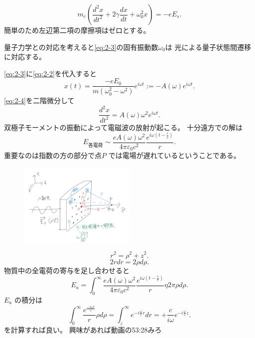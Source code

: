 \documentclass[dvipdfmx,12pt]{jsarticle}
\begin{document}
\begin{equation}
\label{eq:2-3}
m_e \left( \frac{d^2x}{dt^2}+2\gamma \frac{dx}{dt}+\omega_0^2x \right) =-eE_s
.\end{equation}
簡単のため左辺第二項の摩擦項はゼロとする。

量子力学との対応を考えると\eqref{eq:2-3}の固有振動数$\omega_0$は
光による量子状態間遷移に対応する。

\eqref{eq:2-3}に\eqref{eq:2-2}を代入すると
\begin{equation}
\label{eq:2-4}
	x(t)=\frac{-eE_0}{m(\omega_0^2-\omega^2)}e^{i\omega t}:=-A(\omega)e^{i\omega t}
.\end{equation}
\eqref{eq:2-4}を二階微分して
\begin{equation}
\label{eq:2-5}
	\frac{d^2x}{dt^2}=A(\omega)\omega^2e^{i\omega t}
.\end{equation}
双極子モーメントの振動によって電磁波の放射が起こる。
十分遠方での解は
\begin{equation}
\label{eq:2-6}
E_\text{各電荷} \sim \frac{eA(\omega)\omega^2}{4\pi\varepsilon_0c^2} \frac{e^{i\omega(t-\frac{r}{c})}}{r}
.\end{equation}
重要なのは指数の方の部分で点$P$ では電場が遅れているということである。
\begin{figure}[H]
	\centering
	\includegraphics[width=0.5\textwidth]{fig2/Fig-5.jpg}
	\label{fig:fig2-Fig-5-jpg}
\end{figure}
\[
r^2=\rho^2+z^2
.\] 
\[
2r dr=2\rho d\rho 
.\] 
物質中の全電荷の寄与を足し合わせると
\begin{equation}
\label{eq:2-7}
	E_a=\int_{0}^{\infty} \frac{eA(\omega)\omega^2}{4\pi\varepsilon_0c^2}\frac{e^{i\omega(t-\frac{r}{c})}}{r}\eta 2\pi \rho d\rho 
.\end{equation}
$E_a$ の積分は
\begin{equation}
\label{eq:2-8}
\int_{0}^{\infty} \frac{e^{\frac{-i\omega r}{c}}}{r}\rho d\rho = \int_{z}^{\infty} e^{-i \frac{\omega}{c}r}dr  =+\frac{c}{i\omega}e^{-i \frac{\omega}{c}z}
.\end{equation}
を計算すれば良い。
興味があれば動画の53:28みろ
\end{document}
